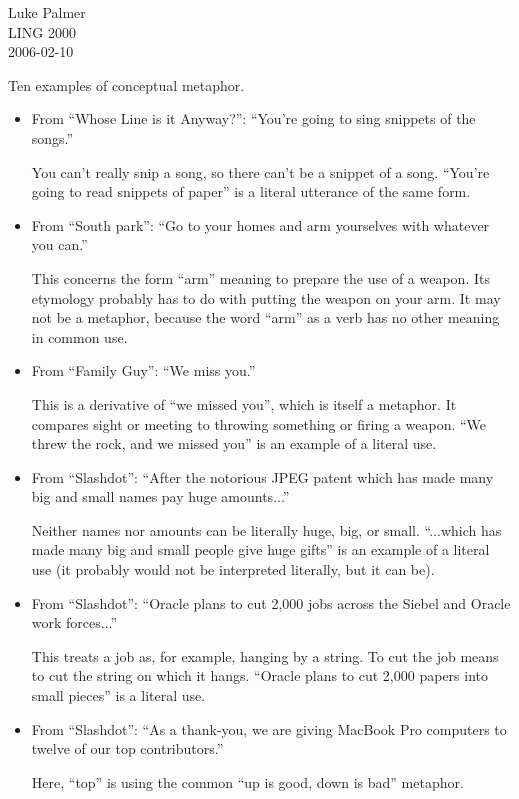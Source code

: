 \documentclass[12pt]{article}
\begin{document}
\noindent
Luke Palmer \\
LING 2000 \\
2006-02-10

Ten examples of conceptual metaphor.

\begin{itemize}
\item From ``Whose Line is it Anyway?'': ``You're going to sing snippets
of the songs.''

You can't really snip a song, so there can't be a snippet of a song.
``You're going to read snippets of paper'' is a literal utterance of the
same form.

\item From ``South park'': ``Go to your homes and arm yourselves with
whatever you can.''

This concerns the form ``arm'' meaning to prepare the use of a weapon.
Its etymology probably has to do with putting the weapon on your arm.
It may not be a metaphor, because the word ``arm'' as a verb has no
other meaning in common use.

\item From ``Family Guy'': ``We miss you.''

This is a derivative of ``we missed you'', which is itself a metaphor.
It compares sight or meeting to throwing something or firing a weapon.
``We threw the rock, and we missed you'' is an example of a literal use.

\item From ``Slashdot'': ``After the notorious JPEG patent which has
made many big and small names pay huge amounts...''

Neither names nor amounts can be literally huge, big, or small.
``...which has made many big and small people give huge gifts'' is an
example of a literal use (it probably would not be interpreted
literally, but it can be).

\item From ``Slashdot'': ``Oracle plans to cut 2,000 jobs across the
Siebel and Oracle work forces...''

This treats a job as, for example, hanging by a string.  To cut the job
means to cut the string on which it hangs.  ``Oracle plans to cut 2,000
papers into small pieces'' is a literal use.

\item From ``Slashdot'': ``As a thank-you, we are giving MacBook Pro
computers to twelve of our top contributors.''

Here, ``top'' is using the common ``up is good, down is bad'' metaphor.


\end{itemize}
\end{document}
